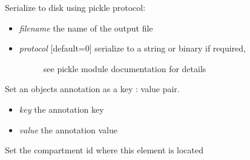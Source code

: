\documentclass[a4paper,11pt,english]{sphinxmanual}
\begin{document}
\begin{fulllineitems}
\begin{fulllineitems}
\begin{itemize}
\begin{description}
\end{description}

\end{itemize}

\end{fulllineitems}


\begin{fulllineitems}
\label{modules_doc:cbmpy.CBModel.Fbase.serializeToDisk}
Serialize to disk using pickle protocol:
\begin{itemize}
\item {} 
\emph{filename} the name of the output file

\item {} \begin{description}
\item[{\emph{protocol} {[}default=0{]} serialize to a string or binary if required,}] \leavevmode
see pickle module documentation for details

\end{description}

\end{itemize}

\end{fulllineitems}


\begin{fulllineitems}
\label{modules_doc:cbmpy.CBModel.Fbase.setAnnotation}
Set an objects annotation as a key : value pair.
\begin{itemize}
\item {} 
\emph{key} the annotation key

\item {} 
\emph{value} the annotation value

\end{itemize}

\end{fulllineitems}


\begin{fulllineitems}
\label{modules_doc:cbmpy.CBModel.Fbase.setCompartmentId}
Set the compartment id where this element is located


\end{fulllineitems}
\end{fulllineitems}
\end{document}
